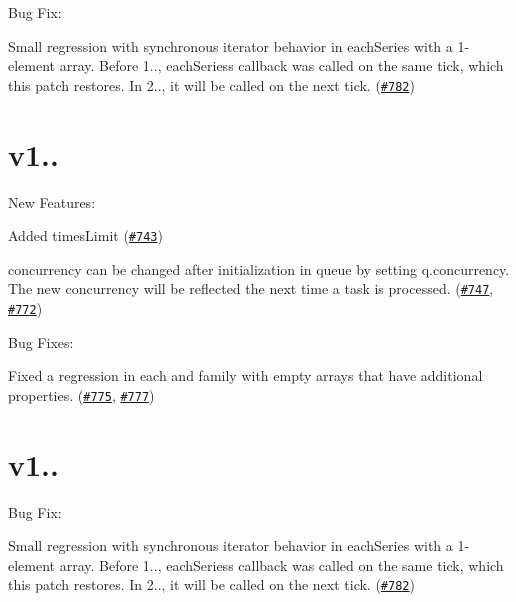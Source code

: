 Bug Fix\+:


\begin{DoxyItemize}
\item Small regression with synchronous iterator behavior in {\ttfamily each\+Series} with a 1-\/element array. Before 1.., {\ttfamily each\+Series}\textquotesingle{}s callback was called on the same tick, which this patch restores. In 2.., it will be called on the next tick. (\href{https://github.com/caolan/async/issues/782}{\tt \#782})
\end{DoxyItemize}

\section*{v1..}

New Features\+:


\begin{DoxyItemize}
\item Added {\ttfamily times\+Limit} (\href{https://github.com/caolan/async/issues/743}{\tt \#743})
\item {\ttfamily concurrency} can be changed after initialization in {\ttfamily queue} by setting {\ttfamily q.\+concurrency}. The new concurrency will be reflected the next time a task is processed. (\href{https://github.com/caolan/async/issues/747}{\tt \#747}, \href{https://github.com/caolan/async/issues/772}{\tt \#772})
\end{DoxyItemize}

Bug Fixes\+:


\begin{DoxyItemize}
\item Fixed a regression in {\ttfamily each} and family with empty arrays that have additional properties. (\href{https://github.com/caolan/async/issues/775}{\tt \#775}, \href{https://github.com/caolan/async/issues/777}{\tt \#777})
\end{DoxyItemize}

\section*{v1..}

Bug Fix\+:


\begin{DoxyItemize}
\item Small regression with synchronous iterator behavior in {\ttfamily each\+Series} with a 1-\/element array. Before 1.., {\ttfamily each\+Series}\textquotesingle{}s callback was called on the same tick, which this patch restores. In 2.., it will be called on the next tick. (\href{https://github.com/caolan/async/issues/782}{\tt \#782})
\end{DoxyItemize}

